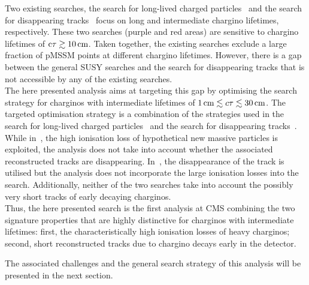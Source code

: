 Two existing searches, the search for long-lived charged particles~\cite{bib:CMS:HSCP_8TeV} and the search for disappearing tracks~\cite{bib:CMS:DT_8TeV} focus on long and intermediate chargino lifetimes, respectively. 
These two searches (purple and red areas) are sensitive to chargino lifetimes of $\text{c}\tau \gtrsim 10\,\text{cm}$.
Taken together, the existing searches exclude a large fraction of pMSSM points at different chargino lifetimes. 
However, there is a gap between the general SUSY searches and the search for disappearing tracks that is not accessible by any of the existing searches.\\

The here presented analysis aims at targeting this gap by optimising the search strategy for charginos with intermediate lifetimes of $1\,\text{cm} \lesssim c\tau \lesssim 30\,\text{cm}$. 
The targeted optimisation strategy is a combination of the strategies used in the search for long-lived charged particles~\cite{bib:CMS:HSCP_8TeV} and the search for disappearing tracks~\cite{bib:CMS:DT_8TeV}.
While in~\cite{bib:CMS:HSCP_8TeV}, the high ionisation loss of hypothetical new massive particles is exploited, the analysis does not take into account whether the associated reconstructed tracks are disappearing.
In~\cite{bib:CMS:DT_8TeV}, the disappearance of the track is utilised but the analysis does not incorporate the large ionisation losses into the search.
Additionally, neither of the two searches take into account the possibly very short tracks of early decaying charginos.\\
\newpage
Thus, the here presented search is the first analysis at CMS combining the two signature properties that are highly distinctive for charginos with intermediate lifetimes: 
first, the characteristically high ionisation losses of heavy charginos;
second, short reconstructed tracks due to chargino decays early in the detector.

The associated challenges and the general search strategy of this analysis will be presented in the next section.

